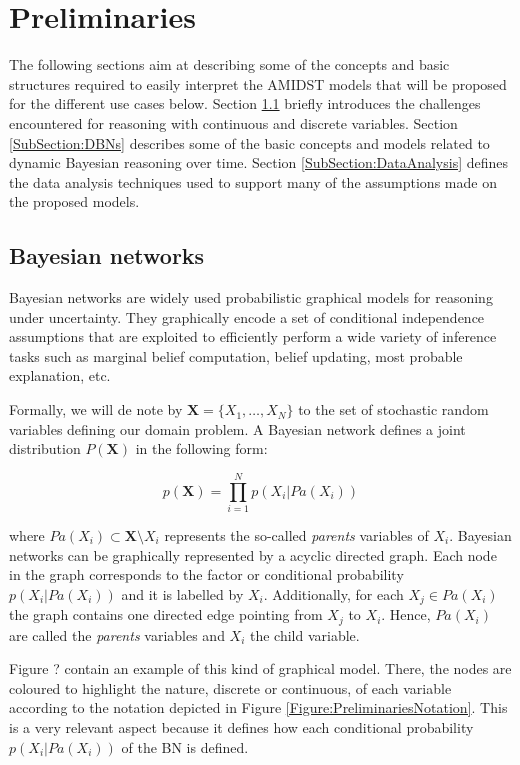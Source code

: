 \section{Preliminaries}\label{Section:Preliminaries}

The following sections aim at describing some of the concepts and basic structures required to easily interpret the AMIDST models that will be proposed for the different use cases below. Section \ref{SubSection:HybridBNs} briefly introduces the challenges encountered for reasoning with continuous and discrete variables. Section \ref{SubSection:DBNs} describes some of the basic concepts and models related to dynamic Bayesian reasoning over time. Section \ref{SubSection:DataAnalysis} defines the data analysis techniques used to support many of the assumptions made on the proposed models.

\subsection{Bayesian networks}\label{SubSection:HybridBNs}

Bayesian networks \cite{JensenNielsen2007} are widely used probabilistic graphical models for reasoning under uncertainty. They graphically encode a set of conditional independence assumptions that are exploited to efficiently perform a wide variety of inference tasks such as marginal belief computation, belief updating, most probable explanation, etc.  

Formally, we will de note by $\bm X = \{X_1,\ldots,X_N\}$ to the set of stochastic random variables defining our domain problem. A Bayesian network defines a joint distribution $P(\bm X)$ in the following form:

$$ p(\bm X) = \prod_{i=1}^N p(X_i|Pa(X_i))$$ 

\noindent where $Pa(X_i)\subset \bm X\setminus X_i$ represents the so-called \emph{parents} variables of $X_i$. Bayesian networks can be graphically represented by a acyclic directed graph. Each node in the graph corresponds to the factor or conditional probability $p(X_i|Pa(X_i))$  and it is labelled by $X_i$. Additionally, for each $X_j\in Pa(X_i)$ the graph contains one directed edge pointing from $X_j$ to $X_i$. Hence, $Pa(X_i)$ are called the \emph{parents} variables and $X_i$ the child variable. 

Figure ? contain an example of this kind of graphical model. There, the nodes are coloured to highlight the nature, discrete or continuous, of each variable according to the notation depicted in Figure \ref{Figure:PreliminariesNotation}. This is a very relevant aspect because it defines how each conditional probability $p(X_i|Pa(X_i))$ of the BN is defined. 

